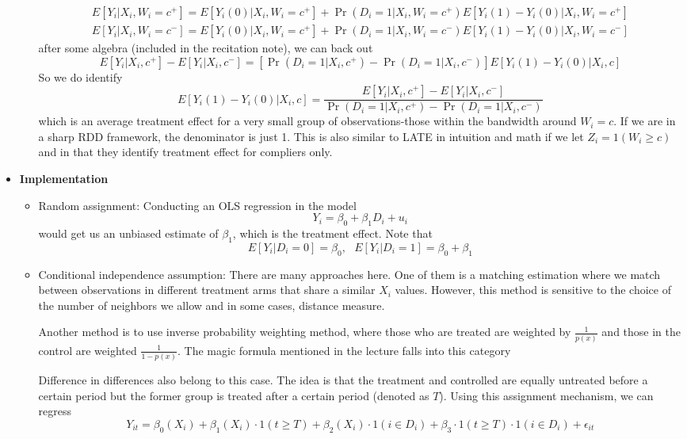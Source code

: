\documentclass[12pt]{article}
\theoremstyle{definition}
\theoremstyle{property}
\theoremstyle{assumption}
\theoremstyle{example}
\theoremstyle{comment}
\begin{document}
\begin{itemize}
\begin{itemize}
\footnotesize{\begin{gather*}
E[Y_i|X_i, W_i=c^+]=E[Y_i(0)|X_i, W_i=c^+]+\Pr(D_i=1|X_i, W_i=c^+)E[Y_i(1)-Y_i(0)|X_i, W_i=c^+]\\
E[Y_i|X_i, W_i=c^-]=E[Y_i(0)|X_i, W_i=c^+]+\Pr(D_i=1|X_i, W_i=c^-)E[Y_i(1)-Y_i(0)|X_i, W_i=c^-]
\end{gather*}}\normalsize
after some algebra (included in the recitation note), we can back out
\footnotesize{\[
E[Y_i|X_i, c^+]-E[Y_i|X_i, c^-]=[\Pr(D_i=1|X_i, c^+)-\Pr(D_i=1|X_i, c^-)]E[Y_i(1)-Y_i(0)|X_i,c]
\]}\normalsize
So we do identify
\[
E[Y_i(1)-Y_i(0)|X_i,c]=\frac{E[Y_i|X_i, c^+]-E[Y_i|X_i, c^-]}{\Pr(D_i=1|X_i, c^+)-\Pr(D_i=1|X_i, c^-)}
\]
which is an average treatment effect for a very small group of observations-those within the bandwidth around $W_i=c$. If we are in a sharp RDD framework, the denominator is just 1. This is also similar to LATE in intuition and math if we let $Z_i=1(W_i\geq c)$ and in that they identify treatment effect for compliers only.
\end{itemize}
\item \textbf{Implementation}
\begin{itemize}
\item Random assignment: Conducting an OLS regression in the model
\[
Y_i = \beta_0+\beta_1D_i+u_i
\]
would get us an unbiased estimate of $\beta_1$,  which is the treatment effect. Note that
\[
E[Y_i|D_i=0]=\beta_0,\ \ \ E[Y_i|D_i=1]=\beta_0+\beta_1
\]
\item Conditional independence assumption: There are many approaches here. One of them is a matching estimation where we match between observations in different treatment arms that share a similar $X_i$ values. However, this method is sensitive to the choice of the number of neighbors we allow and in some cases, distance measure. \par
Another method is to use inverse probability weighting method, where those who are treated are weighted by $\frac{1}{p(x)}$ and those in the control are weighted $\frac{1}{1-p(x)}$. The magic formula mentioned in the lecture falls into this category\par
Difference in differences also belong to this case. The idea is that the treatment and controlled are equally untreated before a certain period but the former group is treated after a certain period (denoted as $T$). Using this assignment mechanism, we can regress
\[
Y_{it}=\beta_0(X_i)+\beta_1(X_i)\cdot1(t\geq T)+\beta_2(X_i)\cdot1(i\in D_i)+\beta_3\cdot1(t\geq T)\cdot1(i\in D_i)+\epsilon_{it}
\]
\end{itemize}
\end{itemize}
\end{document}
